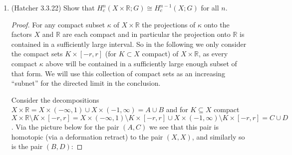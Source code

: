 \documentclass[11pt]{article}
\begin{document}
\begin{enumerate}
\begin{proof}
      For any closed compact set $K$ of the form above, by excision (excising $\infty$) we have the isomorphism $H^n(X^+,X^+\setminus K;G)\cong H^n(X,X\setminus K;G)$, and in the reduced long exact sequence of a pair we have \[\cdots \to \tilde H^{n-1}(X^+\setminus K;G)\to H^n(X^+,X^+\setminus K;G)\to \tilde H^n(X^+;G)\to \tilde H^n(X^+\setminus K;G)\to\cdots.\] Since cones are contractible we have that the groups $H^i(X^+\setminus K;G)$ are trivial, and by exactness we have the isomorphisms $H^n(X^+,X^+\setminus K;G)\to \tilde H^n(X^+;G)$. Then in summary we have the isomorphisms $H^n(X^+,\infty ;G)\cong \tilde H^n(X^+;G)\cong H^n(X^+,X^+\setminus K;G)\cong H^n(X,X\setminus K;G)$. Then take the directed limit along the ``subnet'' of the closed compact $K$ which are complements of decreasingly smaller cones about $\infty$, and obtain that $H^n(X^+,\infty;G)\cong H^n_c(X;G)$ as needed.

      [As for $\mathbb{Z}\times \mathbb{R}$ we cannot have that neighborhoods around $\infty\in (\mathbb{Z}\times\mathbb{R})^+$ are cones, since a complement of a cone must be a closed compact set. By compactness such a set could not intersect every copy of $\mathbb{R}$, so we have a contradiction.]
    \end{proof}
    \item (Hatcher 3.3.22) Show that $H^n_c(X\times\mathbb{R};G)\cong H^{n-1}_c(X;G)$ for all $n$. \begin{proof}
      For any compact subset $\kappa$ of $X\times \mathbb{R}$ the projections of $\kappa$ onto the factors $X$ and $\mathbb{R}$ are each compact and in particular the projection onto $\mathbb{R}$ is contained in a sufficiently large interval. So in the following we only consider the compact sets $K\times[-r,r]$ (for $K\subset X$ compact) of $X\times \mathbb{R}$, as every compact $\kappa$ above will be contained in a sufficiently large enough subset of that form. We will use this collection of compact sets as an increasing ``subnet'' for the directed limit in the conclusion.

      Consider the decompositions $X\times \mathbb{R} = X\times (-\infty,1)\cup X\times (-1,\infty) = A\cup B$ and for $K\subseteq X$ compact $X\times \mathbb{R}\setminus K\times[-r,r] = X\times (-\infty,1)\setminus K\times[-r,r] \cup X\times (-1,\infty)\setminus K\times[-r,r]=C\cup D$. Via the picture below for the pair $(A,C)$ we see that this pair is homotopic (via a deformation retract) to the pair $(X,X)$, and similarly so is the pair $(B,D)$:\vspace{5cm} 


\end{proof}
\end{enumerate}
\end{document}
